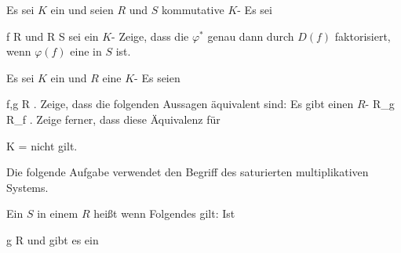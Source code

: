 {}
{





Es sei $K$ ein
und seien $R$ und $S$ kommutative
$K$-
Es sei

\mavergleichskette
{\vergleichskette
{ f
}
{ \in }{ R
}
{  }{
}
{    }{
}
{   }{
}
}
{}{}{}
und
\maabb {\varphi} { R} { S
} {}
sei ein
$K$-
Zeige, dass die
$\varphi^*$ genau dann durch $D(f)$ faktorisiert, wenn $\varphi(f)$ eine
in $S$ ist.





}
{} {}

{}
{





Es sei $K$ ein
und $R$ eine
$K$-
Es seien

\mavergleichskette
{\vergleichskette
{ f,g
}
{ \in }{ R
}
{  }{
}
{    }{
}
{   }{
}
}
{}{}{.}
Zeige, dass die folgenden Aussagen äquivalent sind:
 {Es gibt einen
$R$-
\maabb {} {R_g } { R_f
} {.}
}
Zeige ferner, dass diese Äquivalenz für

\mavergleichskette
{\vergleichskette
{ K
}
{ = }{ \R
}
{  }{
}
{    }{
}
{   }{
}
}
{}{}{}
nicht gilt.





}
{} {}

Die folgende Aufgabe verwendet den Begriff des saturierten multiplikativen Systems.





Ein 
$S$ in einem
$R$ heißt  wenn Folgendes gilt: Ist

\mavergleichskette
{\vergleichskette
{ g
}
{ \in }{ R
}
{  }{
}
{    }{
}
{   }{
}
}
{}{}{}
und gibt es ein

